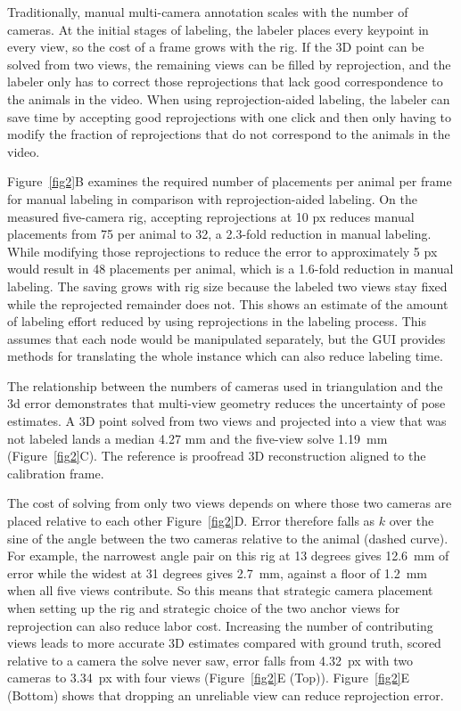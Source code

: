 \documentclass[pdflatex, sn-nature]{sn-jnl}
\theoremstyle{thmstyleone}%
\theoremstyle{thmstyletwo}%
\theoremstyle{thmstylethree}%
\begin{document}
Traditionally, manual multi-camera annotation scales with the number of cameras. At the initial stages of labeling, the labeler places every keypoint in every view, so the cost of a frame grows with the rig. If the 3D point can be solved from two views, the remaining views can be filled by reprojection, and the labeler only has to correct those reprojections that lack good correspondence to the animals in the video. When using reprojection-aided labeling, the labeler can save time by accepting good reprojections with one click and then only having to modify the fraction of reprojections that do not correspond to the animals in the video. 

Figure~\ref{fig2}B examines the required number of placements per animal per frame for manual labeling in comparison with reprojection-aided labeling. On the measured five-camera rig, accepting reprojections at 10 px reduces manual placements from 75 per animal to 32, a 2.3-fold reduction in manual labeling. While modifying those reprojections to reduce the error to approximately 5 px would result in 48 placements per animal, which is a 1.6-fold reduction in manual labeling. The saving grows with rig size because the labeled two views stay fixed while the reprojected remainder does not. This shows an estimate of the amount of labeling effort reduced by using reprojections in the labeling process. This assumes that each node would be manipulated separately, but the GUI provides methods for translating the whole instance which can also reduce labeling time. 

The relationship between the numbers of cameras used in triangulation and the 3d error demonstrates that multi-view geometry reduces the uncertainty of pose estimates. A 3D point solved from two views and projected into a view that was not labeled lands a median 4.27 mm and the five-view solve 1.19~mm (Figure~\ref{fig2}C). The reference is proofread 3D reconstruction aligned to the calibration frame. 

The cost of solving from only two views depends on where those two cameras are placed relative to each other Figure~\ref{fig2}D. Error therefore falls as $k$ over the sine of the angle between the two cameras relative to the animal (dashed curve).  For example, the narrowest angle pair on this rig at 13 degrees gives 12.6~mm of error while the widest at 31 degrees gives 2.7~mm, against a floor of 1.2~mm when all five views contribute. So this means that strategic camera placement when setting up the rig and strategic choice of the two anchor views for reprojection can also reduce labor cost. Increasing the number of contributing views leads to more accurate 3D estimates compared with ground truth, scored relative to a camera the solve never saw, error falls from 4.32~px with two cameras to 3.34~px with four views (Figure~\ref{fig2}E (Top)). Figure~\ref{fig2}E (Bottom) shows that dropping an unreliable view can reduce reprojection error.
\end{document}
